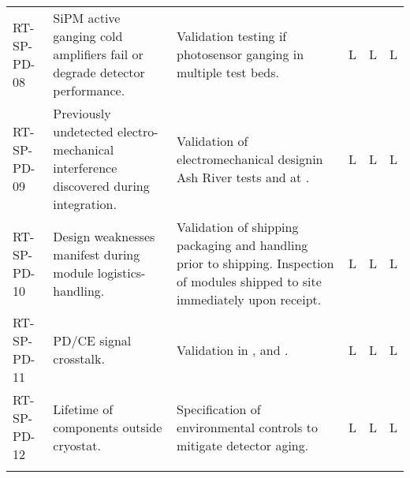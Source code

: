 \begin{footnotesize}
\begin{longtable}{P{0.18\textwidth}P{0.20\textwidth}P{0.32\textwidth}P{0.02\textwidth}P{0.02\textwidth}P{0.02\textwidth}}
RT-SP-PD-08 & SiPM active ganging cold amplifiers fail or degrade detector performance. & Validation testing if photosensor ganging in multiple test beds. & L & L & L \\  \colhline
RT-SP-PD-09 & Previously undetected electro-mechanical interference discovered during integration. & Validation of electromechanical designin Ash River tests and at . & L & L & L \\  \colhline
RT-SP-PD-10 & Design weaknesses manifest during module logistics-handling. & Validation of shipping packaging and handling prior to shipping.  Inspection of modules shipped to site immediately upon receipt. & L & L & L \\  \colhline
RT-SP-PD-11 & PD/CE signal crosstalk. & Validation in ,  and . & L & L & L \\  \colhline
RT-SP-PD-12 & Lifetime of  components outside cryostat. & Specification of environmental controls to mitigate detector aging. & L & L & L \\  \colhline

\label{tab:risks:SP-FD-PD}
\end{longtable}
\end{footnotesize}